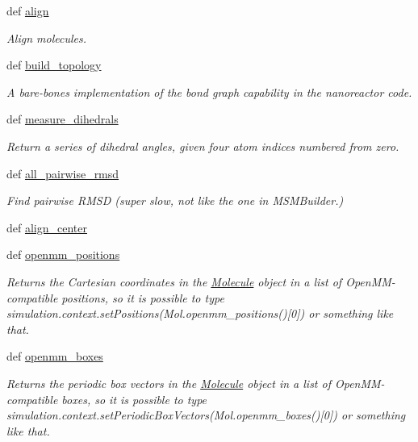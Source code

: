 \begin{DoxyCompactItemize}
def \hyperlink{classforcebalance_1_1molecule_1_1Molecule_a87e66db685214a9cdd4feff49d4ea5dc}{align}
\begin{DoxyCompactList}\small\item\em Align molecules. \end{DoxyCompactList}\item 
def \hyperlink{classforcebalance_1_1molecule_1_1Molecule_a071f18dacd881f761462f772bb0cf632}{build\-\_\-topology}
\begin{DoxyCompactList}\small\item\em A bare-\/bones implementation of the bond graph capability in the nanoreactor code. \end{DoxyCompactList}\item 
def \hyperlink{classforcebalance_1_1molecule_1_1Molecule_aa6b0a08a6579f697667c83e04927298c}{measure\-\_\-dihedrals}
\begin{DoxyCompactList}\small\item\em Return a series of dihedral angles, given four atom indices numbered from zero. \end{DoxyCompactList}\item 
def \hyperlink{classforcebalance_1_1molecule_1_1Molecule_af412b655371674434ec63b4bfea6d8c0}{all\-\_\-pairwise\-\_\-rmsd}
\begin{DoxyCompactList}\small\item\em Find pairwise R\-M\-S\-D (super slow, not like the one in M\-S\-M\-Builder.) \end{DoxyCompactList}\item 
def \hyperlink{classforcebalance_1_1molecule_1_1Molecule_aff7a0e2413297088a5bc3e91e5951f3f}{align\-\_\-center}
\item 
def \hyperlink{classforcebalance_1_1molecule_1_1Molecule_a57edc8d72f7e4c1a1452de7b438f3c55}{openmm\-\_\-positions}
\begin{DoxyCompactList}\small\item\em Returns the Cartesian coordinates in the \hyperlink{classforcebalance_1_1molecule_1_1Molecule}{Molecule} object in a list of Open\-M\-M-\/compatible positions, so it is possible to type simulation.\-context.\-set\-Positions(Mol.\-openmm\-\_\-positions()\mbox{[}0\mbox{]}) or something like that. \end{DoxyCompactList}\item 
def \hyperlink{classforcebalance_1_1molecule_1_1Molecule_aa20a420f4b450bfa9e632fae037ecb01}{openmm\-\_\-boxes}
\begin{DoxyCompactList}\small\item\em Returns the periodic box vectors in the \hyperlink{classforcebalance_1_1molecule_1_1Molecule}{Molecule} object in a list of Open\-M\-M-\/compatible boxes, so it is possible to type simulation.\-context.\-set\-Periodic\-Box\-Vectors(Mol.\-openmm\-\_\-boxes()\mbox{[}0\mbox{]}) or something like that. \end{DoxyCompactList}\item 

\end{DoxyCompactItemize}
